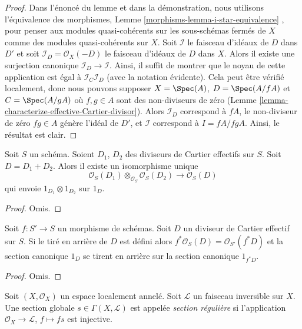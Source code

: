 \begin{proof}
Dans l'énoncé du lemme et dans la démonstration, nous utilisons l'équivalence des
morphismes, Lemme  \ref{morphisms-lemma-i-star-equivalence} , pour penser aux modules quasi-cohérents sur les
sous-schémas fermés de  $X$  comme des modules quasi-cohérents sur
 $X$. Soit  $\mathcal{I}$  le faisceau d'idéaux de  $D$  dans
 $D'$  et soit  $\mathcal{I}_D = \mathcal{O}_X(-D)$  le faisceau d'idéaux de  $D$  dans
 $X$. Alors il existe une surjection canonique  $\mathcal{I}_D \to \mathcal{I}$. Ainsi, il
suffit de montrer que le noyau de cette application est égal à  $\mathcal{I}_C\mathcal{I}_D$  (avec
la notation évidente). Cela peut être vérifié localement, donc nous pouvons
supposer  $X = \Spec(A)$,  $D = \Spec(A/fA)$  et  $C = \Spec(A/gA)$  où  $f, g \in A$  sont des
non-diviseurs de zéro (Lemme  \ref{lemma-characterize-effective-Cartier-divisor}). Alors  $\mathcal{I}_D$  correspond à
 $fA$, le non-diviseur de zéro  $fg \in A$  génère l'idéal de  $D'$,
et  $\mathcal{I}$  correspond à  $I = fA/fgA$. Ainsi, le résultat est clair.
\end{proof}

\begin{lemma}
\label{lemma-invertible-sheaf-sum-effective-Cartier-divisors}
Soit  $S$  un schéma. Soient  $D_1$,  $D_2$  des diviseurs de
Cartier effectifs sur  $S$. Soit  $D = D_1 + D_2$. Alors il existe un
isomorphisme unique
$$
\mathcal{O}_S(D_1) \otimes_{\mathcal{O}_S} \mathcal{O}_S(D_2)
\longrightarrow
\mathcal{O}_S(D)
$$
qui envoie  $1_{D_1} \otimes 1_{D_2}$  sur  $1_D$.
\end{lemma}

\begin{proof}
Omis.
\end{proof}

\begin{lemma}
\label{lemma-pullback-effective-Cartier-divisors}
Soit  $f : S' \to S$  un morphisme de schémas. Soit  $D$  un diviseur de
Cartier effectif sur  $S$. Si le tiré en arrière de  $D$  est
défini alors  $f^*\mathcal{O}_S(D) = \mathcal{O}_{S'}(f^*D)$  et la section canonique  $1_D$  se tirent en
arrière sur la section canonique  $1_{f^*D}$.
\end{lemma}

\begin{proof}
Omis.
\end{proof}

\begin{definition}
\label{definition-regular-section}
Soit  $(X, \mathcal{O}_X)$  un espace localement annelé. Soit  $\mathcal{L}$  un faisceau
inversible sur  $X$. Une section globale  $s \in \Gamma(X, \mathcal{L})$  est appelée
 {\it  section régulière}  si l'application
 $\mathcal{O}_X \to \mathcal{L}$,  $f \mapsto fs$  est injective.
\end{definition}


